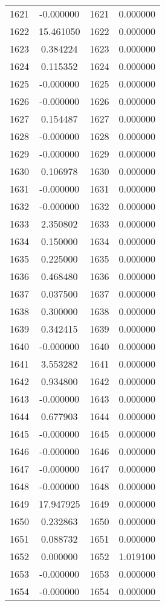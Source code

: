 \documentclass[12pt]{article}
\begin{document}
\begin{longtable}{@{}cccc@{}}
1621 & -0.000000 & 1621 & 0.000000 \\
1622 & 15.461050 & 1622 & 0.000000 \\
1623 & 0.384224 & 1623 & 0.000000 \\
1624 & 0.115352 & 1624 & 0.000000 \\
1625 & -0.000000 & 1625 & 0.000000 \\
1626 & -0.000000 & 1626 & 0.000000 \\
1627 & 0.154487 & 1627 & 0.000000 \\
1628 & -0.000000 & 1628 & 0.000000 \\
1629 & -0.000000 & 1629 & 0.000000 \\
1630 & 0.106978 & 1630 & 0.000000 \\
1631 & -0.000000 & 1631 & 0.000000 \\
1632 & -0.000000 & 1632 & 0.000000 \\
1633 & 2.350802 & 1633 & 0.000000 \\
1634 & 0.150000 & 1634 & 0.000000 \\
1635 & 0.225000 & 1635 & 0.000000 \\
1636 & 0.468480 & 1636 & 0.000000 \\
1637 & 0.037500 & 1637 & 0.000000 \\
1638 & 0.300000 & 1638 & 0.000000 \\
1639 & 0.342415 & 1639 & 0.000000 \\
1640 & -0.000000 & 1640 & 0.000000 \\
1641 & 3.553282 & 1641 & 0.000000 \\
1642 & 0.934800 & 1642 & 0.000000 \\
1643 & -0.000000 & 1643 & 0.000000 \\
1644 & 0.677903 & 1644 & 0.000000 \\
1645 & -0.000000 & 1645 & 0.000000 \\
1646 & -0.000000 & 1646 & 0.000000 \\
1647 & -0.000000 & 1647 & 0.000000 \\
1648 & -0.000000 & 1648 & 0.000000 \\
1649 & 17.947925 & 1649 & 0.000000 \\
1650 & 0.232863 & 1650 & 0.000000 \\
1651 & 0.088732 & 1651 & 0.000000 \\
1652 & 0.000000 & 1652 & 1.019100 \\
1653 & -0.000000 & 1653 & 0.000000 \\
1654 & -0.000000 & 1654 & 0.000000 \\

\end{longtable}
\end{document}
